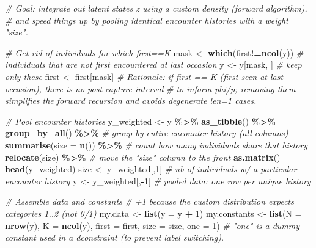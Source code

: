 \documentclass[
  12pt,
]{krantz}
\newenvironment{Shaded}{\begin{snugshade}}{\end{snugshade}}
\newcommand{\AttributeTok}[1]{\textcolor[rgb]{0.13,0.29,0.53}{#1}}
\newcommand{\CommentTok}[1]{\textcolor[rgb]{0.56,0.35,0.01}{\textit{#1}}}
\newcommand{\DecValTok}[1]{\textcolor[rgb]{0.00,0.00,0.81}{#1}}
\newcommand{\FunctionTok}[1]{\textcolor[rgb]{0.13,0.29,0.53}{\textbf{#1}}}
\newcommand{\NormalTok}[1]{#1}
\newcommand{\OtherTok}[1]{\textcolor[rgb]{0.56,0.35,0.01}{#1}}
\newcommand{\SpecialCharTok}[1]{\textcolor[rgb]{0.81,0.36,0.00}{\textbf{#1}}}
\begin{document}
\begin{Shaded}
\begin{Highlighting}[]
\CommentTok{\# Goal: integrate out latent states z using a custom density (forward algorithm),}
\CommentTok{\# and speed things up by pooling identical encounter histories with a weight "size".}

\CommentTok{\# Get rid of individuals for which first==K}
\NormalTok{mask }\OtherTok{\textless{}{-}} \FunctionTok{which}\NormalTok{(first}\SpecialCharTok{!=}\FunctionTok{ncol}\NormalTok{(y)) }\CommentTok{\# individuals that are not first encountered at last occasion}
\NormalTok{y }\OtherTok{\textless{}{-}}\NormalTok{ y[mask, ]                }\CommentTok{\# keep only these}
\NormalTok{first }\OtherTok{\textless{}{-}}\NormalTok{ first[mask]}
\CommentTok{\# Rationale: if first == K (first seen at last occasion), there is no post{-}capture interval}
\CommentTok{\# to inform phi/p; removing them simplifies the forward recursion and avoids degenerate len=1 cases.}

\CommentTok{\# Pool encounter histories}
\NormalTok{y\_weighted }\OtherTok{\textless{}{-}}\NormalTok{ y }\SpecialCharTok{\%\textgreater{}\%} 
  \FunctionTok{as\_tibble}\NormalTok{() }\SpecialCharTok{\%\textgreater{}\%} 
  \FunctionTok{group\_by\_all}\NormalTok{() }\SpecialCharTok{\%\textgreater{}\%}                 \CommentTok{\# group by entire encounter history (all columns)}
  \FunctionTok{summarise}\NormalTok{(}\AttributeTok{size =} \FunctionTok{n}\NormalTok{()) }\SpecialCharTok{\%\textgreater{}\%}          \CommentTok{\# count how many individuals share that history}
  \FunctionTok{relocate}\NormalTok{(size) }\SpecialCharTok{\%\textgreater{}\%}                 \CommentTok{\# move the "size" column to the front}
  \FunctionTok{as.matrix}\NormalTok{()}
\FunctionTok{head}\NormalTok{(y\_weighted)}
\NormalTok{size }\OtherTok{\textless{}{-}}\NormalTok{ y\_weighted[,}\DecValTok{1}\NormalTok{] }\CommentTok{\# nb of individuals w/ a particular encounter history}
\NormalTok{y }\OtherTok{\textless{}{-}}\NormalTok{ y\_weighted[,}\SpecialCharTok{{-}}\DecValTok{1}\NormalTok{]   }\CommentTok{\# pooled data: one row per unique history}

\CommentTok{\# Assemble data and constants}
\CommentTok{\# +1 because the custom distribution expects categories 1..2 (not 0/1)}
\NormalTok{my.data }\OtherTok{\textless{}{-}} \FunctionTok{list}\NormalTok{(}\AttributeTok{y =}\NormalTok{ y }\SpecialCharTok{+} \DecValTok{1}\NormalTok{)}
\NormalTok{my.constants }\OtherTok{\textless{}{-}} \FunctionTok{list}\NormalTok{(}\AttributeTok{N =} \FunctionTok{nrow}\NormalTok{(y), }
                     \AttributeTok{K =} \FunctionTok{ncol}\NormalTok{(y), }
                     \AttributeTok{first =}\NormalTok{ first,}
                     \AttributeTok{size =}\NormalTok{ size,}
                     \AttributeTok{one =} \DecValTok{1}\NormalTok{)}
\CommentTok{\# "one" is a dummy constant used in a dconstraint (to prevent label switching).}


\end{Highlighting}
\end{Shaded}
\end{document}
